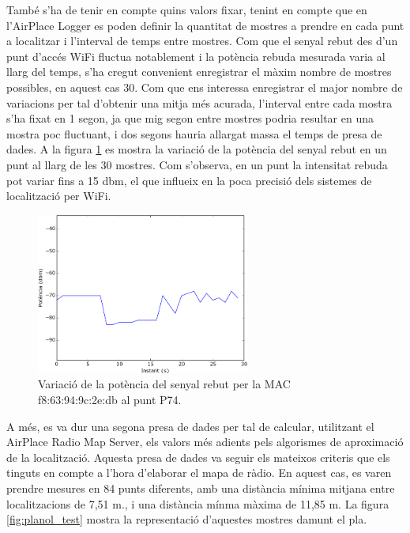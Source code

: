 També s'ha de tenir en compte quins valors fixar, tenint en compte que en l'AirPlace Logger es poden definir la quantitat de mostres a prendre en cada punt a localitzar i l'interval de temps entre mostres. Com que el senyal rebut des d'un punt d'accés WiFi fluctua notablement i la potència rebuda mesurada varia al llarg del temps, s'ha cregut convenient enregistrar el màxim nombre de mostres possibles, en aquest cas 30. Com que ens interessa enregistrar el major nombre de variacions per tal d'obtenir una mitja més acurada, l'interval entre cada mostra s'ha fixat en 1 segon, ja que mig segon entre mostres podria resultar en una mostra poc fluctuant, i dos segons hauria allargat massa el temps de presa de dades. A la figura \ref{fig:fluctuacio} es mostra la variació de la potència del senyal rebut en un punt al llarg de les 30 mostres. Com s'observa, en un punt la intensitat rebuda pot variar fins a 15 dbm, el que influeix en la poca precisió dels sistemes de localització per WiFi.

\begin{figure}[ht]
\begin{center}
\includegraphics[width=7cm]{imatges/fluctuacio.png}
\caption{Variació de la potència del senyal rebut per la MAC f8:63:94:9c:2e:db al punt P74.}
\label{fig:fluctuacio}
\end{center}
\end{figure}

A més, es va dur una segona presa de dades per tal de calcular, utilitzant el AirPlace Radio Map Server, els valors més adients pels algorismes de aproximació de la localització. Aquesta presa de dades va seguir els mateixos criteris que els tinguts en compte a l'hora d'elaborar el mapa de ràdio. En aquest cas, es varen prendre mesures en 84 punts diferents, amb una distància mínima mitjana entre localitzacions de 7,51 m., i una distància mínma màxima de 11,85 m. La figura \ref{fig:planol_test} mostra la representació d'aquestes mostres damunt el pla.

